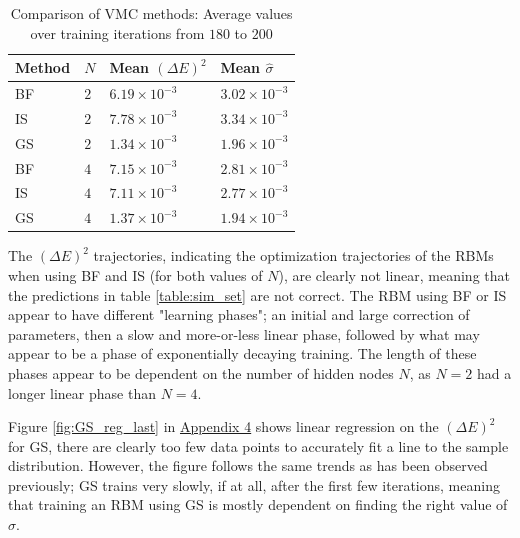 \documentclass[%
oneside,                 %
final,                   %
10pt]{article}
\begin{document}
\begin{table}[H]
\begin{center}
\begin{tabular}{llll}
\hline
Method & $N$ & Mean $(\Delta E)^2$ & Mean $\hat \sigma$ \\
\hline
BF &$2$ &  $ 6.19\times 10^{-3} $ & $ 3.02\times 10^{-3} $  \\
IS &$2$ &  $ 7.78\times 10^{-3} $ & $ 3.34\times 10^{-3} $  \\
GS &$2$ &  $ 1.34\times 10^{-3} $ & $1.96\times 10^{-3} $  \\
BF &$4$ &  $ 7.15\times 10^{-3} $ & $ 2.81\times 10^{-3} $  \\
IS &$4$ &  $ 7.11\times 10^{-3} $ & $ 2.77\times 10^{-3} $  \\
GS &$4$ &  $ 1.37\times 10^{-3} $ & $1.94\times 10^{-3} $  \\
\hline
\end{tabular}
\end{center}
\caption{Comparison of VMC methods: Average values over training iterations from $180$ to $200$}
\label{table:200_avr}
\end{table}

The $(\Delta E)^2$ trajectories, indicating the optimization trajectories of the RBMs when using BF and IS (for both values of $N$), are clearly not linear, meaning that the predictions in table \ref{table:sim_set} are not correct. The RBM using BF or IS appear to have different "learning phases"; an initial and large correction of parameters, then a slow and more-or-less linear phase, followed by what may appear to be a phase of exponentially decaying training. The length of these phases appear to be dependent on the number of hidden nodes $N$, as $N=2$ had a longer linear phase than $N=4$. 

Figure \ref{fig:GS_reg_last} in \hyperref[APP_4]{Appendix 4} shows linear regression on the $(\Delta E)^2$ for GS, there are clearly too few data points to accurately fit a line to the sample distribution. However, the figure follows the same trends as has been observed previously; GS trains very slowly, if at all, after the first few iterations, meaning that training an RBM using GS is mostly dependent on finding the right value of $\sigma$. 
\end{document}
